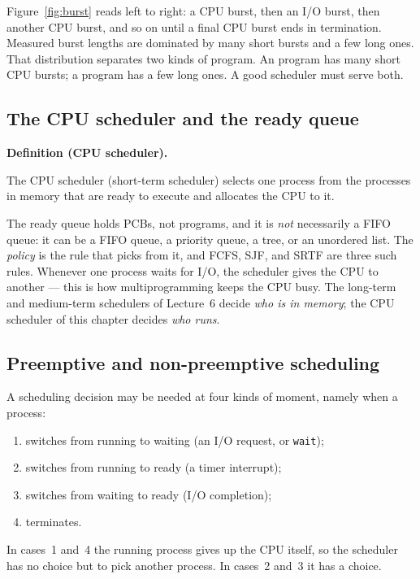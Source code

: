 \documentclass[11pt]{article}
\newenvironment{definitionbox}[1]{%
  \par\noindent\textbf{Definition (#1).}\ \itshape
}{\par\vspace{0.3em}}
\begin{document}
Figure~\ref{fig:burst} reads left to right: a CPU burst, then an I/O burst, then
another CPU burst, and so on until a final CPU burst ends in termination.
Measured burst lengths are dominated by many short bursts and a few long ones.
That distribution separates two kinds of program. An  program has
many short CPU bursts; a  program has a few long ones. A good
scheduler must serve both.

\subsection*{The CPU scheduler and the ready queue}

\begin{definitionbox}{CPU scheduler}
The CPU scheduler (short-term scheduler) selects one process from the processes
in memory that are ready to execute and allocates the CPU to it.
\end{definitionbox}

The ready queue holds PCBs, not programs, and it is \emph{not} necessarily a
FIFO queue: it can be a FIFO queue, a priority queue, a tree, or an unordered
list. The \emph{policy} is the rule that picks from it, and FCFS, SJF, and SRTF
are three such rules. Whenever one process waits for I/O, the scheduler gives
the CPU to another --- this is how multiprogramming keeps the CPU busy. The
long-term and medium-term schedulers of Lecture~6 decide \emph{who is in
memory}; the CPU scheduler of this chapter decides \emph{who runs}.

\subsection*{Preemptive and non-preemptive scheduling}

A scheduling decision may be needed at four kinds of moment, namely when a
process:

\begin{enumerate}
  \item switches from running to waiting (an I/O request, or \texttt{wait});
  \item switches from running to ready (a timer interrupt);
  \item switches from waiting to ready (I/O completion);
  \item terminates.
\end{enumerate}

\noindent In cases~1 and~4 the running process gives up the CPU itself, so the
scheduler has no choice but to pick another process. In cases~2 and~3 it has a
choice.
\end{document}
